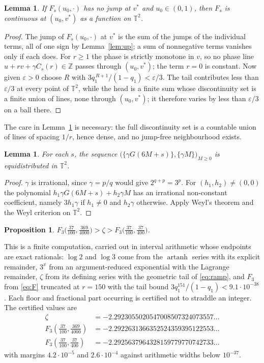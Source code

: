 \documentclass[11pt,a4paper]{article}
\theoremstyle{plain}
\newtheorem{proposition}[theorem]{Proposition}
\newtheorem{lemma}[theorem]{Lemma}
\theoremstyle{definition}
\newcommand{\Z}{\mathbb{Z}}
\newcommand{\T}{\mathbb{T}}
\newcommand{\ga}{\gamma}
\newcommand{\fr}[1]{\{#1\}}
\begin{document}
\begin{lemma}\label{lem:2d}
If $F_s(u_0,\cdot)$ has no jump at $v^*$ and $u_0\in(0,1)$, then $F_s$ is continuous at $(u_0,v^*)$
as a function on $\T^2$.
\end{lemma}

\begin{proof}
The jump of $F_s(u_0,\cdot)$ at $v^*$ is the sum of the jumps of the individual terms, all of one
sign by Lemma~\ref{lem:up}; a sum of nonnegative terms vanishes only if each does. For $r\ge1$ the
phase is strictly monotone in $v$, so no phase line $u+rv+\ga C_s(r)\in\Z$ passes through
$(u_0,v^*)$; the term $r=0$ is constant. Now given $\varepsilon>0$ choose $R$ with
$3q_1^{\,R+1}/(1-q_1)<\varepsilon/3$. The tail contributes less than $\varepsilon/3$ at every point
of $\T^2$, while the head is a finite sum whose discontinuity set is a finite union of lines, none
through $(u_0,v^*)$; it therefore varies by less than $\varepsilon/3$ on a ball there.
\end{proof}

The care in Lemma~\ref{lem:2d} is necessary: the full discontinuity set is a countable union of
lines of spacing $1/r$, hence dense, and no jump-free neighbourhood exists.

\begin{lemma}\label{lem:weyl}
For each $s$, the sequence $\big(\fr{\ga G(6M+s)},\fr{\ga M}\big)_{M\ge0}$ is equidistributed in
$\T^2$.
\end{lemma}

\begin{proof}
$\ga$ is irrational, since $\ga=p/q$ would give $2^{q+p}=3^p$. For $(h_1,h_2)\ne(0,0)$ the
polynomial $h_1\ga G(6M+s)+h_2\ga M$ has an irrational non-constant coefficient, namely $3h_1\ga$ if
$h_1\ne0$ and $h_2\ga$ otherwise. Apply Weyl's theorem and the Weyl criterion on $\T^2$.
\end{proof}

\begin{proposition}\label{prop:straddle}
$F_3\big(\tfrac{37}{100},\tfrac{369}{4000}\big)>\zeta>F_3\big(\tfrac{37}{100},\tfrac{37}{400}\big)$.
\end{proposition}

This is a finite computation, carried out in interval arithmetic whose endpoints are exact
rationals: $\log2$ and $\log3$ come from the $\operatorname{artanh}$ series with its explicit
remainder, $3^x$ from an argument-reduced exponential with the Lagrange remainder, $\zeta$ from its
defining series with the geometric tail of \eqref{eq:ramp}, and $F_3$ from \eqref{eq:F} truncated at
$r=150$ with the tail bound $3q_1^{151}/(1-q_1)<9.1\cdot10^{-38}$. Each floor and fractional part
occurring is certified not to straddle an integer. The certified values are
\[
\begin{array}{ll}
  \zeta &=-2.2923055020547008507324073557\ldots\\
  F_3(\tfrac{37}{100},\tfrac{369}{4000}) &=-2.2922631366352524359395122553\ldots\\
  F_3(\tfrac{37}{100},\tfrac{37}{400}) &=-2.2925637964328159779770742733\ldots
\end{array}
\]
with margins $4.2\cdot10^{-5}$ and $2.6\cdot10^{-4}$ against arithmetic widths below $10^{-37}$.
\end{document}

